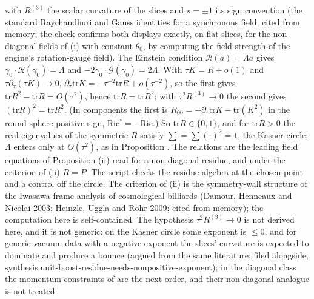 with $R^{(3)}$ the scalar curvature of the slices and $s = \pm 1$ its sign convention (the standard Raychaudhuri and Gauss identities for a synchronous field, cited from memory; the check confirms both displays exactly, on flat slices, for the non-diagonal fields of (i) with constant $\theta_{0}$, by computing the field strength of the engine's rotation-gauge field). The Einstein condition $\mathcal{R}(a) = \Lambda a$ gives $\gamma_{0} \cdot \mathcal{R}(\gamma_{0}) = \Lambda$ and $-2\gamma_{0} \cdot \mathcal{G}(\gamma_{0}) = 2\Lambda$. With $\tau K = R + o(1)$ and $\tau\partial_{\tau}(\tau K) \to 0$, $\partial_{\tau}\mathrm{tr}K = -\tau^{-2}\mathrm{tr}R + o(\tau^{-2})$, so the first gives $\mathrm{tr}R^{2} - \mathrm{tr}R = O(\tau^{2})$, hence $\mathrm{tr}R = \mathrm{tr}R^{2}$; with $\tau^{2}R^{(3)} \to 0$ the second gives $(\mathrm{tr}R)^{2} = \mathrm{tr}R^{2}$. (In components the first is $R_{00} = -\partial_{\tau}\mathrm{tr}K - \mathrm{tr}(K^{2})$ in the round-sphere-positive sign, $\mathrm{Ric}^{\circ} = -\mathrm{Ric}$.) So $\mathrm{tr}R \in \{0, 1\}$, and for $\mathrm{tr}R > 0$ the real eigenvalues of the symmetric $R$ satisfy $\sum = \sum(\cdot)^{2} = 1$, the Kasner circle; $\Lambda$ enters only at $O(\tau^{2})$, as in Proposition . The relations are the leading field equations of Proposition (ii) read for a non-diagonal residue, and under the criterion of (ii) $R = P$. The script checks the residue algebra at the chosen point and a control off the circle. The criterion of (ii) is the symmetry-wall structure of the Iwasawa-frame analysis of cosmological billiards (Damour, Henneaux and Nicolai 2003; Heinzle, Uggla and Rohr 2009; cited from memory); the computation here is self-contained. The hypothesis $\tau^{2}R^{(3)} \to 0$ is not derived here, and it is not generic: on the Kasner circle some exponent is $\leq 0$, and for generic vacuum data with a negative exponent the slices' curvature is expected to dominate and produce a bounce (argued from the same literature; filed alongside, synthesis.unit-boost-residue-needs-nonpositive-exponent); in the diagonal class the momentum constraints of  are the next order, and their non-diagonal analogue is not treated.

